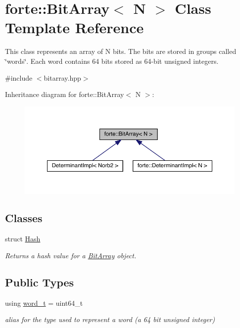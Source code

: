 \hypertarget{classforte_1_1_bit_array}{}\section{forte\+:\+:Bit\+Array$<$ N $>$ Class Template Reference}
\label{classforte_1_1_bit_array}


This class represents an array of N bits. The bits are stored in groups called \char`\"{}words\char`\"{}. Each word contains 64 bits stored as 64-\/bit unsigned integers.  




{\ttfamily \#include $<$bitarray.\+hpp$>$}



Inheritance diagram for forte\+:\+:Bit\+Array$<$ N $>$\+:
\nopagebreak
\begin{figure}[H]
\begin{center}
\leavevmode
\includegraphics[width=350pt]{classforte_1_1_bit_array__inherit__graph}
\end{center}
\end{figure}
\subsection*{Classes}
\begin{DoxyCompactItemize}
\item 
struct \mbox{\hyperlink{structforte_1_1_bit_array_1_1_hash}{Hash}}
\begin{DoxyCompactList}\small\item\em Returns a hash value for a \mbox{\hyperlink{classforte_1_1_bit_array}{Bit\+Array}} object. \end{DoxyCompactList}\end{DoxyCompactItemize}
\subsection*{Public Types}
\begin{DoxyCompactItemize}
\item 
using \mbox{\hyperlink{classforte_1_1_bit_array_a7f3b4ebbbe4bc80ce60cc6614cb565da}{word\+\_\+t}} = uint64\+\_\+t
\begin{DoxyCompactList}\small\item\em alias for the type used to represent a word (a 64 bit unsigned integer) \end{DoxyCompactList}\end{DoxyCompactItemize}
